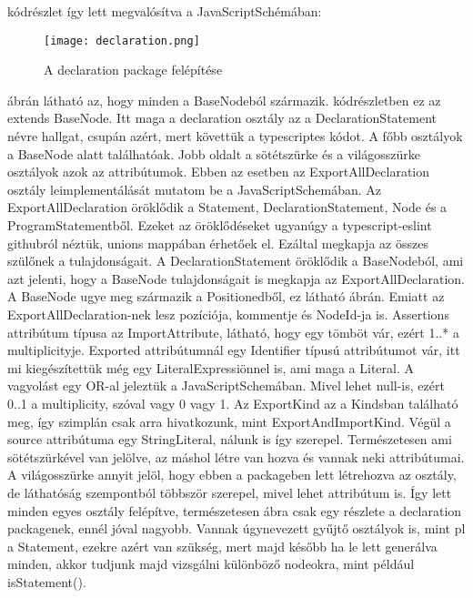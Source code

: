  kódrészlet így lett megvalósítva a JavaScriptSchémában:

\begin{figure}[!htbp]
      \caption{A declaration package felépítése}\label{fig:declaration_vpp}
      \centering
      \texttt{[image: declaration.png]}
\end{figure}

 ábrán látható az, hogy minden a BaseNodeból származik.  kódrészletben ez az extends BaseNode.
Itt maga a declaration osztály az a DeclarationStatement névre hallgat, csupán azért, mert követtük a typescriptes kódot. A főbb osztályok a BaseNode alatt találhatóak.
Jobb oldalt a sötétszürke és a világosszürke osztályok azok az attribútumok.
Ebben az esetben az ExportAllDeclaration osztály leimplementálását mutatom be a JavaScriptSchemában.
Az ExportAllDeclaration öröklődik a Statement, DeclarationStatement, Node és a ProgramStatementből.
Ezeket az öröklődéseket ugyanúgy a typescript-eslint githubról néztük, unions mappában érhetőek el.
Ezáltal megkapja az összes szülőnek a tulajdonságait. A DeclarationStatement öröklődik a BaseNodeból, ami azt jelenti, hogy a BaseNode tulajdonságait is megkapja az ExportAllDeclaration.
A BaseNode ugye meg származik a Positionedből, ez látható  ábrán.
Emiatt az ExportAllDeclaration-nek lesz pozíciója, kommentje és NodeId-ja is.
Assertions attribútum típusa az ImportAttribute, látható, hogy egy tömböt vár, ezért 1..* a multiplicityje.
Exported attribútumnál egy Identifier típusú attribútumot vár, itt mi kiegészítettük még egy LiteralExpressiönnel is, ami maga a Literal.
A vagyolást egy OR-al jeleztük a JavaScriptSchemában.
Mivel lehet null-is, ezért 0..1 a multiplicity, szóval vagy 0 vagy 1.
Az ExportKind az a Kindsban található meg, így szimplán csak arra hivatkozunk, mint ExportAndImportKind.
Végül a source attribútuma egy StringLiteral, nálunk is így szerepel.
Természetesen ami sötétszürkével van jelölve, az máshol létre van hozva és vannak neki attribútumai.
A világosszürke annyit jelöl, hogy ebben a packageben lett létrehozva az osztály, de láthatóság szempontból többször szerepel, mivel lehet attribútum is.
Így lett minden egyes osztály felépítve, természetesen  ábra csak egy részlete a declaration packagenek, ennél jóval nagyobb.
Vannak úgynevezett gyűjtő osztályok is, mint pl a Statement, ezekre azért van szükség, mert majd később ha le lett generálva minden, akkor tudjunk majd vizsgálni különböző nodeokra, mint például isStatement().

